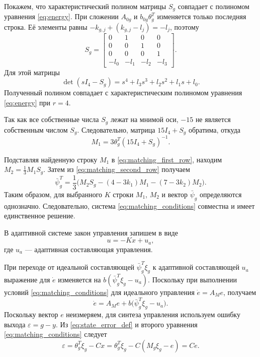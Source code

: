 Покажем, что характеристический полином матрицы $S_g$
совпадает с полиномом уравнения \eqref{eq:energy}.
При сложении $A_{0g}$ и $b_{0g}\theta_g^T$ изменяется только
последняя строка. Её элементы равны
$-k_{g,j}+(k_{g,j}-l_j)=-l_j$, поэтому
$$
S_g=
\begin{bmatrix}
        0   &  1   &  0   &  0\\
        0   &  0   &  1   &  0\\
        0   &  0   &  0   &  1\\
    -l_0 & -l_1 & -l_2 & -l_3
\end{bmatrix}.
$$
Для этой матрицы
$$
    \det(sI_4-S_g)=s^4+l_3s^3+l_2s^2+l_1s+l_0.
$$
Полученный полином совпадает с характеристическим полиномом
уравнения \eqref{eq:energy} при $r=4$.

Так как все собственные числа $S_g$ лежат на мнимой оси,
$-15$ не является собственным числом $S_g$. Следовательно,
матрица $15I_4+S_g$ обратима, откуда
$$
    M_1=3\theta_g^T(15I_4+S_g)^{-1}.
$$

Подставляя найденную строку $M_1$ в \eqref{eq:matching_first_row},
находим $M_2=\frac{1}{3}M_1S_g$. Затем из
\eqref{eq:matching_second_row} получаем
\[
    \bar{\psi}_g^T=
    \frac{1}{3}\bigl(M_2S_g-(4-3k_1)M_1-(7-3k_2)M_2\bigr).
\]
Таким образом, для выбранного $K$ строки $M_1$, $M_2$ и вектор
$\bar{\psi}_g$ определяются однозначно. Следовательно, система
\eqref{eq:matching_conditions} совместна и имеет единственное решение.

В адаптивной системе закон управления запишем в виде
\begin{equation}
    u=-Kx+u_a,
    \label{eq:control_structure}
\end{equation}
где $u_a$ --- адаптивная составляющая управления.

При переходе от идеальной составляющей $\bar{\psi}_g^T\xi_g$
к адаптивной составляющей $u_a$ выражение для $\dot e$
изменяется на $b(\bar{\psi}_g^T\xi_g-u_a)$.
Поскольку при выполнении условий \eqref{eq:matching_conditions}
для идеального управления $\dot e=A_Me$, получаем
\begin{equation}
    \dot e=A_Me+b\bigl(\bar{\psi}_g^T\xi_g-u_a\bigr).
    \label{eq:state_error}
\end{equation}
Поскольку вектор $e$ неизмеряем, для синтеза управления используем
ошибку выхода $\varepsilon=g-y$. Из \eqref{eq:state_error_def}
и второго уравнения \eqref{eq:matching_conditions} следует
\[
    \varepsilon
    =\theta_g^T\xi_g-Cx
    =\theta_g^T\xi_g-C(M_g\xi_g-e)
    =Ce.
\]

